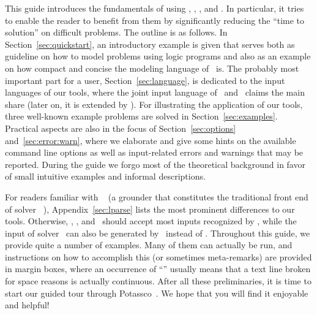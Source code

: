 This guide introduces the fundamentals of using
\gringo, \clasp, \clingo, and \iclingo.
In particular, it tries to enable the reader to benefit from them
by significantly reducing the ``time to solution'' on difficult problems.
The outline is as follows.
In Section~\ref{sec:quickstart},
an introductory example is given
that serves both as guideline on how to model problems using logic programs
and also as an example on how compact and concise the modeling language of \gringo\ is.
The probably most important part for a user, Section~\ref{sec:language},
is dedicated to the input languages of our tools,
where the joint input language of \gringo\ and \clingo\
claims the main share (later on, it is extended by \iclingo).
For illustrating the application of our tools,
three well-known example problems are solved in Section~\ref{sec:examples}.
Practical aspects are also in the focus of Section~\ref{sec:options} and~\ref{sec:error:warn},
where we elaborate and give some hints on the available command line options
as well as input-related errors and warnings that may be reported.
During the guide we forgo most of the theoretical background in favor
of small intuitive examples and informal descriptions.

For readers familiar with \lparse~\cite{lparseManual}
(a grounder that constitutes the traditional front end of solver \smodels~\cite{siniso02a}),
Appendix~\ref{sec:lparse}
lists the most prominent differences to our tools.
Otherwise, \gringo, \clingo, and \iclingo\ should accept most inputs recognized by \lparse,
while the input of solver \clasp\ can also be generated by \lparse\ instead of \gringo.
Throughout this guide, we provide quite a number of examples.
Many of them can actually be run, and instructions on how to accomplish this
(or sometimes meta-remarks)
are provided in margin boxes, where an occurrence of ``''
usually means that a text line broken for space reasons is actually continuous.
After all these preliminaries, it is time to start our guided tour
through Potassco~\cite{potassco}.
We hope that you will find it enjoyable and helpful!


